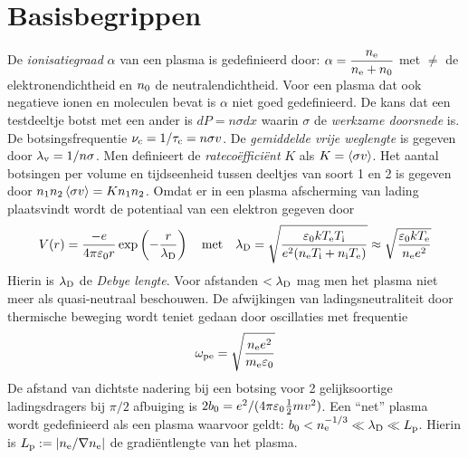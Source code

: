 \section{Basisbegrippen}
De {\it ionisatiegraad} $\alpha$ van een plasma is gedefinieerd door:
$\displaystyle\alpha=\frac{\ne}{\ne+\no}$
\npar
met $\ne$ de elektronendichtheid en $\no$ de neutralendichtheid. Voor een
plasma dat ook negatieve ionen en moleculen bevat is $\alpha$ niet goed
gedefinieerd.
\npar
De kans dat een testdeeltje botst met een ander is $dP=n\sigma dx$ waarin
$\sigma$ de {\it werkzame doorsnede} is. De botsingsfrequentie
$\nu_{\rm c}=1/\tau_{\rm c}=n\sigma v$. De {\it gemiddelde vrije weglengte}
is gegeven door $\lambda_{\rm v}=1/n\sigma$. Men definieert de
{\it rateco\"effici\"ent} $K$ als $K=\av{\sigma v}$. Het aantal botsingen per
volume en tijdseenheid tussen deeltjes van soort 1 en 2 is gegeven door
$n_1n_2\av{\sigma v}=Kn_1n_2$.
\npar
Omdat er in een plasma afscherming van lading plaatsvindt wordt de potentiaal
van een elektron gegeven door
\[
V(r)=\frac{-e}{4\pi\varepsilon_0r}\exp\left(-\frac{r}{\lambda_{\rm D}}\right)
~~~\mbox{met}~~~
\lambda_{\rm D}=\sqrt{\frac{\varepsilon_0k\Te\Ti}{e^2(\ne\Ti+\ni\Te)}}\approx
\sqrt{\frac{\varepsilon_0k\Te}{\ne e^2}}
\]
Hierin is $\lambda_{\rm D}$ de {\it Debye lengte}. Voor afstanden
$<\lambda_{\rm D}$ mag men het plasma niet meer als quasi-neutraal beschouwen.
De afwijkingen van ladingsneutraliteit door thermische beweging wordt teniet
gedaan door oscillaties met frequentie
\[
\omega_{\rm pe}=\sqrt{\frac{\ne e^2}{m_{\rm e}\varepsilon_0}}
\]
De afstand van dichtste nadering bij een botsing voor 2 gelijksoortige
ladingsdragers bij $\pi/2$ afbuiging is
$2b_0=e^2/(4\pi\varepsilon_0\half mv^2)$. Een ``net'' plasma wordt
gedefinieerd als een plasma waarvoor geldt:
$b_0<\ne^{-1/3}\ll\lambda_{\rm D}\ll L_{\rm p}$. Hierin is
$L_{\rm p}:=|\ne/\nabla\ne|$ de gradi\"entlengte van het plasma.

